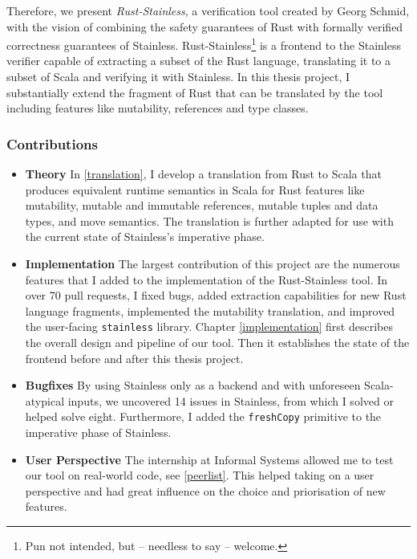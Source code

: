 Therefore, we present \emph{Rust-Stainless}, a verification tool created by
Georg Schmid, with the vision of combining the safety guarantees of Rust with
formally verified correctness guarantees of Stainless.
Rust-Stainless\footnote{Pun not intended, but -- needless to say -- welcome.} is
a frontend to the Stainless verifier capable of extracting a subset of the Rust
language, translating it to a subset of Scala and verifying it with Stainless.
In this thesis project, I substantially extend the fragment of Rust that can be
translated by the tool including features like mutability, references and type
classes.

\subsubsection{Contributions}

\begin{itemize}

\item \textbf{Theory} In \autoref{translation}, I develop a translation from
Rust to Scala that produces equivalent runtime semantics in Scala for Rust
features like mutability, mutable and immutable references, mutable tuples and
data types, and move semantics. The translation is further adapted for use with
the current state of Stainless's imperative phase.

\item \textbf{Implementation} The largest contribution of this project are the
numerous features that I added  to the implementation of the Rust-Stainless
tool. In over 70 pull requests, I fixed bugs, added extraction capabilities for
new Rust language fragments, implemented the mutability translation, and
improved the user-facing \lstinline!stainless! library. Chapter
\ref{implementation} first describes the overall design and pipeline of our
tool. Then it establishes the state of the frontend before and after this thesis
project.

\item \textbf{Bugfixes} By using Stainless only as a backend and with unforeseen
Scala-atypical inputs, we uncovered 14 issues in Stainless, from which I solved
or helped solve eight. Furthermore, I added the \lstinline!freshCopy! primitive
to the imperative phase of Stainless.

\item \textbf{User Perspective} The internship at Informal Systems allowed me to
test our tool on real-world code, see \autoref{peerlist}. This helped taking on
a user perspective and had great influence on the choice and priorisation of new
features.

\end{itemize}
